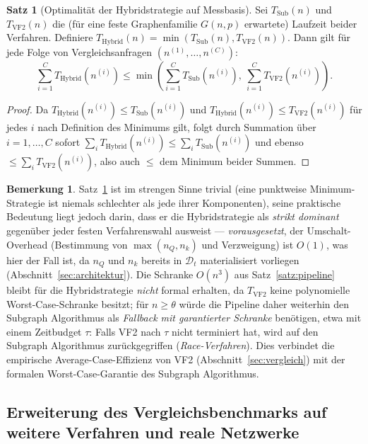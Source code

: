 \documentclass[a4paper,12pt]{article}
\theoremstyle{definition}
\newtheorem{satz}{Satz}
\newtheorem{bemerkung}{Bemerkung}
\begin{document}
\begin{satz}[Optimalität der Hybridstrategie auf Messbasis]
	\label{satz:hybrid}
	Sei $T_{\text{Sub}}(n)$ und $T_{\text{VF2}}(n)$ die (für eine feste Graphenfamilie $G(n,p)$ erwartete) Laufzeit beider Verfahren. Definiere $T_{\text{Hybrid}}(n) = \min(T_{\text{Sub}}(n), T_{\text{VF2}}(n))$. Dann gilt für jede Folge von Vergleichsanfragen $(n^{(1)},\ldots,n^{(C)})$:
	\[
	\sum_{i=1}^{C} T_{\text{Hybrid}}(n^{(i)}) \le \min\left(\sum_{i=1}^{C} T_{\text{Sub}}(n^{(i)}),\ \sum_{i=1}^{C} T_{\text{VF2}}(n^{(i)})\right).
	\]
\end{satz}

\begin{proof}
	Da $T_{\text{Hybrid}}(n^{(i)}) \le T_{\text{Sub}}(n^{(i)})$ und $T_{\text{Hybrid}}(n^{(i)}) \le T_{\text{VF2}}(n^{(i)})$ für jedes $i$ nach Definition des Minimums gilt, folgt durch Summation über $i=1,\ldots,C$ sofort $\sum_i T_{\text{Hybrid}}(n^{(i)}) \le \sum_i T_{\text{Sub}}(n^{(i)})$ und ebenso $\le \sum_i T_{\text{VF2}}(n^{(i)})$, also auch $\le$ dem Minimum beider Summen.
\end{proof}

\begin{bemerkung}
	Satz~\ref{satz:hybrid} ist im strengen Sinne trivial (eine punktweise Minimum-Strategie ist niemals schlechter als jede ihrer Komponenten), seine praktische Bedeutung liegt jedoch darin, dass er die Hybridstrategie als \emph{strikt dominant} gegenüber jeder festen Verfahrenswahl ausweist — \emph{vorausgesetzt}, der Umschalt-Overhead (Bestimmung von $\max(n_Q,n_k)$ und Verzweigung) ist $O(1)$, was hier der Fall ist, da $n_Q$ und $n_k$ bereits in $\mathcal{D}_t$ materialisiert vorliegen (Abschnitt~\ref{sec:architektur}). Die Schranke $O(n^3)$ aus Satz~\ref{satz:pipeline} bleibt für die Hybridstrategie \emph{nicht} formal erhalten, da $T_{\text{VF2}}$ keine polynomielle Worst-Case-Schranke besitzt; für $n\ge\theta$ würde die Pipeline daher weiterhin den Subgraph Algorithmus als \emph{Fallback mit garantierter Schranke} benötigen, etwa mit einem Zeitbudget $\tau$: Falls VF2 nach $\tau$ nicht terminiert hat, wird auf den Subgraph Algorithmus zurückgegriffen (\emph{Race-Verfahren}). Dies verbindet die empirische Average-Case-Effizienz von VF2 (Abschnitt~\ref{sec:vergleich}) mit der formalen Worst-Case-Garantie des Subgraph Algorithmus.
\end{bemerkung}

\subsection{Erweiterung des Vergleichsbenchmarks auf weitere Verfahren und reale Netzwerke}
\label{sec:bench_erweiterung}
\end{document}
